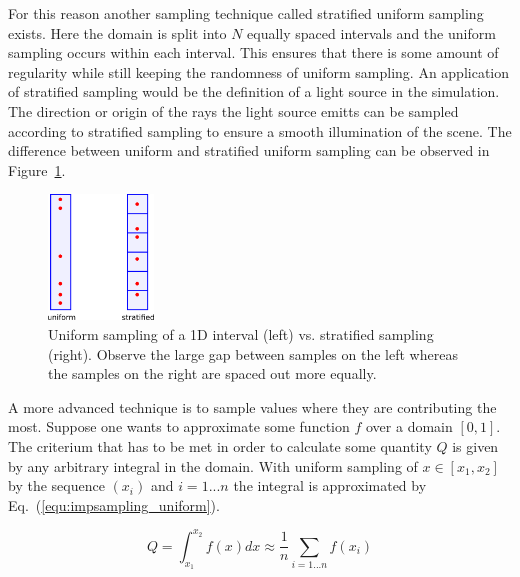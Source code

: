 \documentclass[a4paper,10pt]{article}
\newcommand{\equref}[1]{Eq.~(\ref{#1})}
\newcommand{\figref}[1]{Figure~\ref{#1}}
\begin{document}
    For this reason another sampling technique called stratified uniform
    sampling exists.
    Here the domain is split into $N$ equally spaced intervals and the
    uniform sampling occurs within each interval.
    This ensures that there is some amount of regularity while still
    keeping the randomness of uniform sampling.
    An application of stratified sampling would be the definition of
    a light source in the simulation.
    The direction or origin of the rays the light source emitts can be
    sampled according to stratified sampling to ensure a smooth
    illumination of the scene.
    The difference between uniform and stratified uniform sampling can
    be observed in \figref{fig:uniform_vs_stratified}.

    \begin{center}
        \begin{figure}
            \centering    
            \includegraphics[width=0.25\textwidth]{images/stratified.png}
            \caption[Uniform vs. stratified sampling]{
                Uniform sampling of a 1D interval (left) vs. stratified sampling (right).
                Observe the large gap between samples on the left whereas
                the samples on the right are spaced out more equally.
            }
            \label{fig:uniform_vs_stratified}
        \end{figure}
    \end{center}

    A more advanced technique is to sample values where they are contributing
    the most.
    Suppose one wants to approximate some function $f$ over a domain
    $[0,1]$.
    The criterium that has to be met in order to calculate some quantity
    $Q$ is given by any arbitrary integral in the domain.
    With uniform sampling of $x \in [x_1,x_2]$ by the sequence 
    $(x_i)$ and $i = 1...n$ the integral is approximated
    by \equref{equ:impsampling_uniform}.

    \begin{equation}
        \label{equ:impsampling_uniform}
        Q = \int_{x_1}^{x_2} f(x) dx \approx \frac{1}{n} \sum_{i = 1...n} f(x_i)
    \end{equation}
\end{document}
